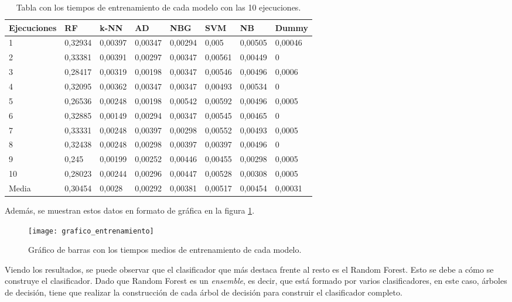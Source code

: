 \begin{table}[h]
	\small
	\begin{center}
		\begin{tabular}{ l l l l l l l l }
			\toprule
			\textbf{Ejecuciones} & \textbf{RF} & \textbf{k-NN} & \textbf{AD} & \textbf{NBG} & \textbf{SVM} & \textbf{NB} & \textbf{Dummy} \\ \midrule
			1 & 0,32934 & 0,00397 & 0,00347 & 0,00294 & 0,005 & 0,00505 & 0,00046 \\
			2 & 0,33381 & 0,00391 & 0,00297 & 0,00347 & 0,00561 & 0,00449 & 0 \\ 
			3 & 0,28417 & 0,00319 & 0,00198 & 0,00347 & 0,00546 & 0,00496 & 0,0006 \\
			4 & 0,32095 & 0,00362 & 0,00347 & 0,00347 & 0,00493 & 0,00534 & 0 \\
			5 & 0,26536 & 0,00248 & 0,00198 & 0,00542 & 0,00592 & 0,00496 & 0,0005 \\
			6 & 0,32885 & 0,00149 & 0,00294 & 0,00347 & 0,00545 & 0,00465 & 0 \\
			7 & 0,33331 & 0,00248 & 0,00397 & 0,00298 & 0,00552 & 0,00493 & 0,0005 \\
			8 & 0,32438 & 0,00248 & 0,00298 & 0,00397 & 0,00397 & 0,00496 & 0 \\
			9 & 0,245 & 0,00199 & 0,00252 & 0,00446 & 0,00455 & 0,00298 & 0,0005 \\
			10 & 0,28023 & 0,00244 & 0,00296 & 0,00447 & 0,00528 & 0,00308 & 0,0005 \\ \midrule
			Media & 0,30454 & 0,0028 & 0,00292 & 0,00381 & 0,00517 & 0,00454 & 0,00031 \\ \bottomrule
		\end{tabular}
		\caption{Tabla con los tiempos de entrenamiento de cada modelo con las 10 ejecuciones.}
		\label{tab:tiempos_entrenamiento}
	\end{center}
\end{table}

Además, se muestran estos datos en formato de gráfica en la figura \ref{fig:grafico_entrenamiento}.

\begin{figure}[ht]
	\texttt{[image: grafico\_entrenamiento]}
	\caption{Gráfico de barras con los tiempos medios de entrenamiento de cada modelo.}
	\label{fig:grafico_entrenamiento}
\end{figure} 

Viendo los resultados, se puede observar que el clasificador que más destaca frente al resto es el Random Forest. Esto se debe a cómo se construye el clasificador. Dado que Random Forest es un \textit{ensemble}, es decir, que está formado por varios clasificadores, en este caso, árboles de decisión, tiene que realizar la construcción de cada árbol de decisión para construir el clasificador completo. 

